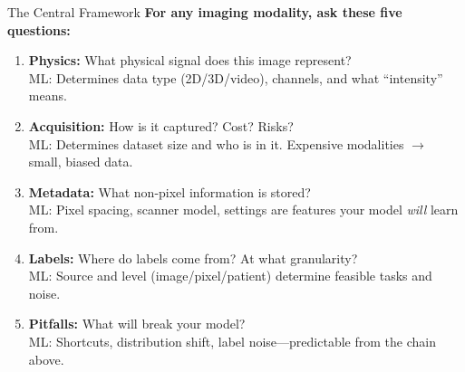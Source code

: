 \documentclass[aspectratio=169,10pt]{beamer}
\begin{document}
\begin{frame}{The Central Framework}
\textbf{For any imaging modality, ask these five questions:}
\begin{enumerate}
    \item \textbf{Physics:} What physical signal does this image represent?\\
        {\footnotesize \textcolor{columbia}{ML:} Determines data type (2D/3D/video), channels, and what ``intensity'' means.}
    \item \textbf{Acquisition:} How is it captured? Cost? Risks?\\
        {\footnotesize \textcolor{columbia}{ML:} Determines dataset size and who is in it. Expensive modalities $\to$ small, biased data.}
    \item \textbf{Metadata:} What non-pixel information is stored?\\
        {\footnotesize \textcolor{columbia}{ML:} Pixel spacing, scanner model, settings are features your model \emph{will} learn from.}
    \item \textbf{Labels:} Where do labels come from? At what granularity?\\
        {\footnotesize \textcolor{columbia}{ML:} Source and level (image/pixel/patient) determine feasible tasks and noise.}
    \item \textbf{Pitfalls:} What will break your model?\\
        {\footnotesize \textcolor{columbia}{ML:} Shortcuts, distribution shift, label noise---predictable from the chain above.}
\end{enumerate}
\end{frame}
\end{document}
